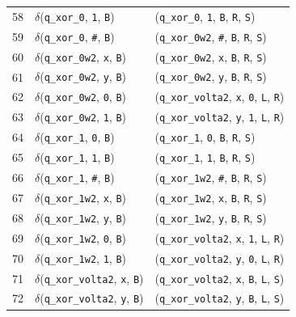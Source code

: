 \documentclass[report, 12pt]{uftreport}
\begin{document}
{\begin{longtable}{r l l}
58 & $\delta$(\texttt{q\_xor\_0}, \texttt{1}, \texttt{B}) & (\texttt{q\_xor\_0}, \texttt{1}, \texttt{B}, \texttt{R}, \texttt{S}) \\
59 & $\delta$(\texttt{q\_xor\_0}, \texttt{\#}, \texttt{B}) & (\texttt{q\_xor\_0w2}, \texttt{\#}, \texttt{B}, \texttt{R}, \texttt{S}) \\
\midrule
60 & $\delta$(\texttt{q\_xor\_0w2}, \texttt{x}, \texttt{B}) & (\texttt{q\_xor\_0w2}, \texttt{x}, \texttt{B}, \texttt{R}, \texttt{S}) \\
61 & $\delta$(\texttt{q\_xor\_0w2}, \texttt{y}, \texttt{B}) & (\texttt{q\_xor\_0w2}, \texttt{y}, \texttt{B}, \texttt{R}, \texttt{S}) \\
62 & $\delta$(\texttt{q\_xor\_0w2}, \texttt{0}, \texttt{B}) & (\texttt{q\_xor\_volta2}, \texttt{x}, \texttt{0}, \texttt{L}, \texttt{R}) \\
63 & $\delta$(\texttt{q\_xor\_0w2}, \texttt{1}, \texttt{B}) & (\texttt{q\_xor\_volta2}, \texttt{y}, \texttt{1}, \texttt{L}, \texttt{R}) \\
\midrule
64 & $\delta$(\texttt{q\_xor\_1}, \texttt{0}, \texttt{B}) & (\texttt{q\_xor\_1}, \texttt{0}, \texttt{B}, \texttt{R}, \texttt{S}) \\
65 & $\delta$(\texttt{q\_xor\_1}, \texttt{1}, \texttt{B}) & (\texttt{q\_xor\_1}, \texttt{1}, \texttt{B}, \texttt{R}, \texttt{S}) \\
66 & $\delta$(\texttt{q\_xor\_1}, \texttt{\#}, \texttt{B}) & (\texttt{q\_xor\_1w2}, \texttt{\#}, \texttt{B}, \texttt{R}, \texttt{S}) \\
\midrule
67 & $\delta$(\texttt{q\_xor\_1w2}, \texttt{x}, \texttt{B}) & (\texttt{q\_xor\_1w2}, \texttt{x}, \texttt{B}, \texttt{R}, \texttt{S}) \\
68 & $\delta$(\texttt{q\_xor\_1w2}, \texttt{y}, \texttt{B}) & (\texttt{q\_xor\_1w2}, \texttt{y}, \texttt{B}, \texttt{R}, \texttt{S}) \\
69 & $\delta$(\texttt{q\_xor\_1w2}, \texttt{0}, \texttt{B}) & (\texttt{q\_xor\_volta2}, \texttt{x}, \texttt{1}, \texttt{L}, \texttt{R}) \\
70 & $\delta$(\texttt{q\_xor\_1w2}, \texttt{1}, \texttt{B}) & (\texttt{q\_xor\_volta2}, \texttt{y}, \texttt{0}, \texttt{L}, \texttt{R}) \\
\midrule
71 & $\delta$(\texttt{q\_xor\_volta2}, \texttt{x}, \texttt{B}) & (\texttt{q\_xor\_volta2}, \texttt{x}, \texttt{B}, \texttt{L}, \texttt{S}) \\
72 & $\delta$(\texttt{q\_xor\_volta2}, \texttt{y}, \texttt{B}) & (\texttt{q\_xor\_volta2}, \texttt{y}, \texttt{B}, \texttt{L}, \texttt{S}) \\

\end{longtable}}
\end{document}
